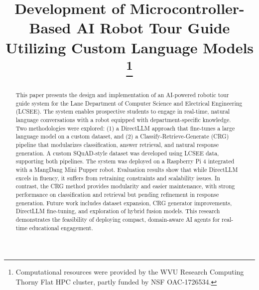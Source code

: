 \documentclass[conference]{IEEEtran}
\begin{document}
\title{Development of Microcontroller-Based AI Robot Tour Guide Utilizing Custom Language Models
\thanks{Computational resources were provided by the WVU Research Computing Thorny Flat HPC cluster, partly funded by NSF OAC-1726534.}
}

\author{
    \and
}

\maketitle
\thispagestyle{plain}
\pagestyle{plain}

\begin{abstract}
    This paper presents the design and implementation of an AI-powered robotic tour guide system for the Lane Department of Computer Science and Electrical Engineering (LCSEE). 
    The system enables prospective students to engage in real-time, natural language conversations with a robot equipped with department-specific knowledge. 
    Two methodologies were explored: (1) a DirectLLM approach that fine-tunes a large language model on a custom dataset, and (2) a Classify-Retrieve-Generate (CRG) pipeline that modularizes classification, answer retrieval, and natural response generation. 
    A custom SQuAD-style dataset was developed using LCSEE data, supporting both pipelines. 
    The system was deployed on a Raspberry Pi 4 integrated with a MangDang Mini Pupper robot. 
    Evaluation results show that while DirectLLM excels in fluency, it suffers from retraining constraints and scalability issues. 
    In contrast, the CRG method provides modularity and easier maintenance, with strong performance on classification and retrieval but pending refinement in response generation. 
    Future work includes dataset expansion, CRG generator improvements, DirectLLM fine-tuning, and exploration of hybrid fusion models. 
    This research demonstrates the feasibility of deploying compact, domain-aware AI agents for real-time educational engagement.
\end{abstract}
\end{document}
